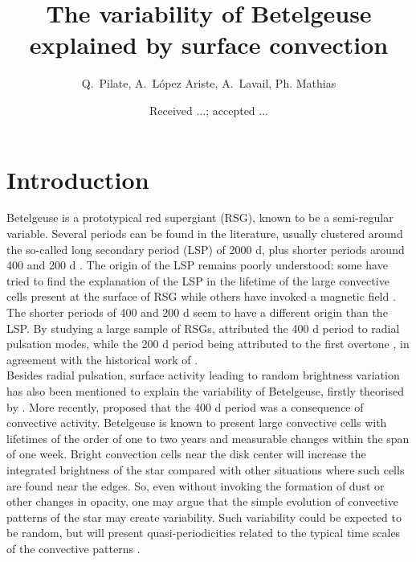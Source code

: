\documentclass{aa}
\begin{document}
 


   \title{The variability  of Betelgeuse explained by surface convection}


    \author{{ Q.~Pilate},{ A.~L{\'o}pez Ariste},{ A.~Lavail},{ Ph. Mathias} }


   \date{Received ...; accepted ...}

 
  \abstract


   \keywords{
               }

   \maketitle
%

\section{Introduction}
Betelgeuse is a prototypical red supergiant (RSG), known to be a semi-regular variable. Several periods can be found in the 
literature, usually clustered around the so-called long secondary period (LSP) of 2000 d, plus shorter periods around 400 and 200 d \citep{kiss_variability_2006}. The origin of the LSP remains poorly understood: some have tried to find the explanation of the LSP in the lifetime of the large convective cells present at the surface of RSG \citep[e.g][]{stothers_giant_2010} while others have invoked a magnetic field \citep{wood_long_2004}. The shorter periods of 400 and 200 d seem to have a different origin than the LSP. By studying a large sample of RSGs, \cite{kiss_variability_2006} attributed the 400 d period to radial pulsation modes, while the 200 d period being attributed to the first overtone \citep{joyce_standing_2020}, in agreement with the historical work of \cite{stothers_pulsation_1969}.\\

Besides radial pulsation, surface activity leading to random brightness variation has also been mentioned to explain the variability of Betelgeuse, firstly theorised by \cite{schwarzschild_scale_1975}. More recently, \cite{gray_mass_2008} proposed that the 400 d period was a consequence of convective activity. Betelgeuse is known to present large convective cells with lifetimes of the order of one to two years \citep{lopez_ariste_convective_2018} and measurable changes 
within the span of one week. Bright convection cells near the disk center will increase the integrated brightness of the star compared with other situations where such cells are found near the edges. So, even without invoking the formation of 
dust or other changes in opacity, one may argue that the simple evolution of convective patterns of the star may create variability. Such 
variability could be expected to be random, but will present quasi-periodicities related to the typical time scales of the 
convective patterns \citep{gray_mass_2008}. \\
\end{document}
